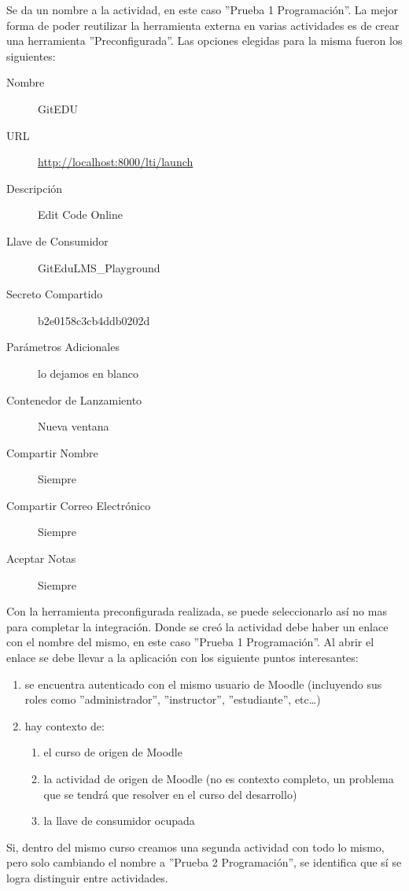 Se da un nombre a la actividad, en este caso ''Prueba 1 Programación''. La mejor forma de poder reutilizar la herramienta externa en varias actividades es de crear una herramienta ''Preconfigurada''. Las opciones elegidas para la misma fueron los siguientes:
\begin{description}
	\item[Nombre] GitEDU
    \item[URL] \url{http://localhost:8000/lti/launch}
    \item[Descripción] Edit Code Online
    \item[Llave de Consumidor] GitEduLMS\_Playground
    \item[Secreto Compartido] b2e0158c3cb4ddb0202d
    \item[Parámetros Adicionales] lo dejamos en blanco
    \item[Contenedor de Lanzamiento] Nueva ventana
    \item[Compartir Nombre] Siempre
    \item[Compartir Correo Electrónico] Siempre
    \item[Aceptar Notas] Siempre
\end{description}
Con la herramienta preconfigurada realizada, se puede seleccionarlo así no mas para completar la integración. Donde se creó la actividad debe haber un enlace con el nombre del mismo, en este caso ''Prueba 1 Programación''. Al abrir el enlace se debe llevar a la aplicación con los siguiente puntos interesantes:
\begin{enumerate}
	\item se encuentra autenticado con el mismo usuario de Moodle (incluyendo sus roles como ''administrador'', ''instructor'', ''estudiante'', etc\ldots{})
    \item hay contexto de:
    \begin{enumerate}
    	\item el curso de origen de Moodle
        \item la actividad de origen de Moodle (no es contexto completo, un problema que se tendrá que resolver en el curso del desarrollo)
        \item la llave de consumidor ocupada
    \end{enumerate}
\end{enumerate}

Si, dentro del mismo curso creamos una segunda actividad con todo lo mismo, pero solo cambiando el nombre a ''Prueba 2 Programación'', se identifica que sí se logra distinguir entre actividades.

